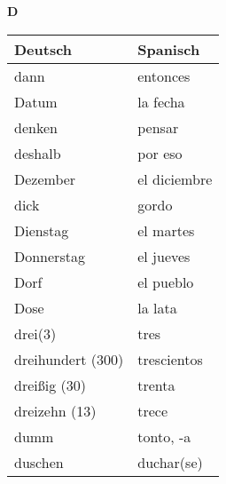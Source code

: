 \begin{flushright}\begin{Huge}\textbf{D}\end{Huge}\end{flushright}

\begin{longtable}{p{} p{}} 
\textbf{Deutsch}     & \textbf{Spanisch}                                       \\ \hline
\hline
\endhead %
dann & entonces\\
Datum & la fecha\\
denken & pensar\\
deshalb & por eso\\
Dezember & el diciembre\\
dick & gordo\\
Dienstag & el martes\\
Donnerstag & el jueves\\
Dorf & el pueblo\\
Dose & la lata\\
drei(3) & tres\\
dreihundert (300) & trescientos\\
dreißig (30) & trenta\\
dreizehn (13) & trece\\
dumm & tonto, -a\\
duschen & duchar(se)\\

\end{longtable}
